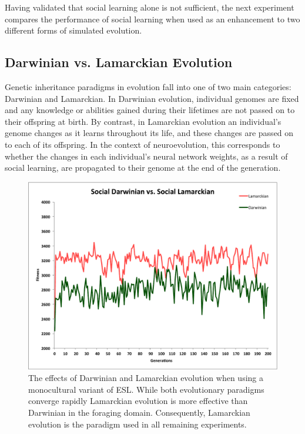 \documentclass{sig-alternate}
\begin{document}
Having validated that social learning alone is not sufficient, the next experiment compares the performance of social learning when used as an enhancement to two different forms of simulated evolution.

\subsection*{Darwinian vs. Lamarckian Evolution}

Genetic inheritance paradigms in evolution fall into one of two main categories: Darwinian and Lamarckian. In Darwinian evolution, individual genomes are fixed and any knowledge or abilities gained during their lifetimes are not passed on to their offspring at birth. By contrast, in Lamarckian evolution an individual's genome changes as it learns throughout its life, and these changes are passed on to each of its offspring. In the context of neuroevolution, this corresponds to whether the changes in each individual's neural network weights, as a result of social learning, are propagated to their genome at the end of the generation.

\begin{figure}
  \centering
    \includegraphics[scale=.41]{darwinian_vs_lamarckian_evolution.pdf}
  \caption{The effects of Darwinian and Lamarckian evolution when using a monocultural variant of ESL.  While both evolutionary paradigms converge rapidly Lamarckian evolution is more effective than Darwinian in the foraging domain.  Consequently, Lamarckian evolution is the paradigm used in all remaining experiments.}
  \label{fig:darwin-lamarck}
\end{figure}
\end{document}
